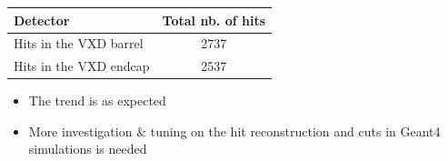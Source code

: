 \documentclass[hyperref={colorlinks=true,pdfpagelabels=false,linkcolor=black}, xcolor=dvipsnames,10pt]{beamer}
\begin{document}
\begin{frame}
	\begin{table}
    \begin{adjustbox}{max width=\textwidth}
      \begin{tabular}{l c}
        \toprule
        Detector & Total nb. of hits \\
        \hline
        Hits in the VXD barrel & 2737 \\
        Hits in the VXD endcap & 2537 \\
        \bottomrule
      \end{tabular}
    \end{adjustbox}
  \end{table}
	
	
	\begin{itemize}
	\item The trend is as expected
	\item More investigation \& tuning on the hit reconstruction and cuts in Geant4 simulations is needed
	\end{itemize}	
	
\end{frame}
\end{document}
